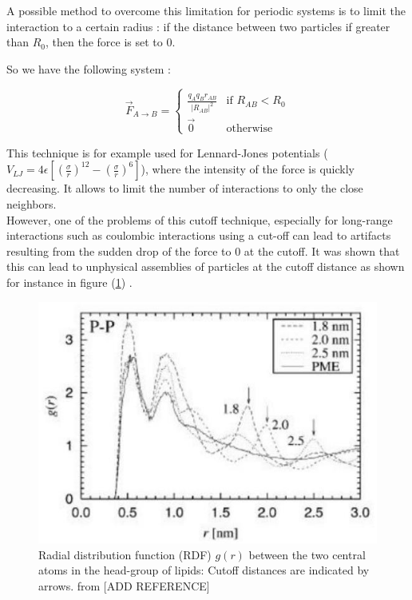 \documentclass[12pt,twoside,a4paper]{report}
\begin{document}
A possible method to overcome this limitation for periodic systems is to limit the interaction to a certain radius : if the distance between two particles if greater than $R_0$, then the force is set to $0$.

So we have the following system :


\begin{equation}
  \overrightarrow{F}_{A \rightarrow B}  =
	\begin{cases}
	  \frac{q_A q_B \hat{r}_{AB} }{|R_{AB}|^2}  & \text{if } R_{AB} < R_0 \\
	  \overrightarrow{0} & \text{otherwise}
	\end{cases}
\end{equation}

This technique is for example used for Lennard-Jones potentials ($V_{LJ} = 4\epsilon [(\frac{\sigma}{r})^12 - (\frac{\sigma}{r})^6] $), where the intensity of the force is quickly decreasing. It allows to limit the number of interactions to only the close neighbors.\\

However, one of the problems of this cutoff technique, especially for long-range interactions such as coulombic interactions using a cut-off can lead to artifacts resulting from the sudden drop of the force to 0 at the cutoff. It was shown that this can lead to unphysical assemblies of particles at the cutoff distance as shown for instance in figure (\ref{fig:artefact}) .

\begin{figure}[H]

\includegraphics[scale=0.8]{artefact}
 \centering
 
\caption{Radial distribution function (RDF) $g(r)$ between the two
central atoms in the head-group of lipids: Cutoff distances are indicated by arrows. from [ADD REFERENCE]}

\label{fig:artefact}

\end{figure}
\end{document}
